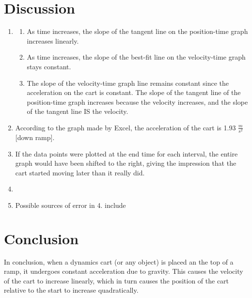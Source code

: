 \documentclass{article}
\begin{document}
\section*{Discussion}
\begin{enumerate}
    \item \begin{enumerate}
        \item As time increases, the slope of the tangent line on the position-time graph increases linearly.
        \item As time increases, the slope of the best-fit line on the velocity-time graph stays constant.
        \item The slope of the velocity-time graph line remains constant since the acceleration on the cart is constant. The slope of the tangent line of the position-time graph increases because the velocity increases, and the slope of the tangent line IS the velocity.
    \end{enumerate}
    \item According to the graph made by Excel, the acceleration of the cart is 1.93 $\frac{m}{s^2}$ [down ramp].
    \item If the data points were plotted at the end time for each interval, the entire graph would have been shifted to the right, giving the impression that the cart started moving later than it really did.
    \item
    \item Possible sources of error in 4. include
\end{enumerate}

\section*{Conclusion}
In conclusion, when a dynamics cart (or any object) is placed an the top of a ramp, it undergoes constant acceleration due to gravity. This causes the velocity of the cart to increase linearly, which in turn causes the position of the cart relative to the start to increase quadratically.
\end{document}
